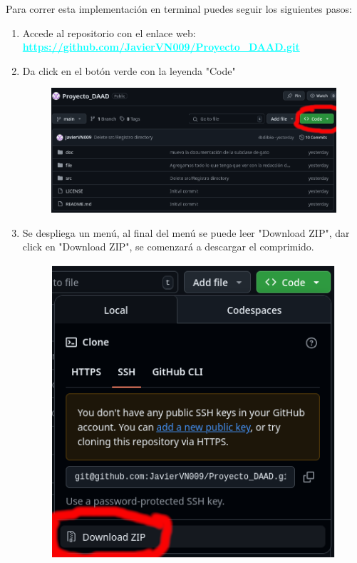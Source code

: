 \documentclass[12pt, Tahoma]{article}
\begin{document}
	
	Para correr esta implementación en terminal puedes seguir los siguientes pasos:
	\begin{enumerate}
		\item Accede al repositorio con el enlace web: \\ 
		\textbf{\textcolor{cyan}{\underline{https://github.com/JavierVN009/Proyecto\_DAAD.git}}}
		\item Da click en el botón verde con la leyenda "Code" 
			\begin{figure}[H]
				\centering
				\includegraphics[scale= 2]{correr1.png}
			\end{figure}
		\item  Se despliega un menú, al final del menú se puede leer "Download ZIP", dar click en "Download ZIP", se comenzará a descargar el comprimido. 
			\begin{figure}[H]
				\centering
				\includegraphics[scale=2]{correr2.png}
			\end{figure}

\end{enumerate}
\end{document}
